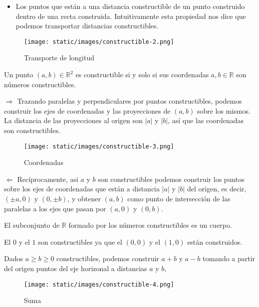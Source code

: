 \begin{itemize}
\tightlist
\item
  Los puntos que están a una distancia constructible de un punto
  construido dentro de una recta construida. Intuitivamente esta
  propiedad nos dice que podemos transportar distancias constructibles.
\end{itemize}

\begin{figure}
\centering
\texttt{[image: static/images/constructible-2.png]}
\caption{Transporte de longitud}
\end{figure}


Un punto \((a,b)\in\mathbb R^2\) es constructible si y solo si sus
coordenadas \(a,b\in\mathbb R\) son números constructibles.


\(\Rightarrow\) Trazando paralelas y perpendiculares por puntos
constructibles, podemos construir los ejes de coordenadas y las
proyecciones de \((a,b)\) sobre los mismos. La distancia de las
proyecciones al origen son \(|a|\) y \(|b|\), así que las coordenadas
son constructibles.

\begin{figure}
\centering
\texttt{[image: static/images/constructible-3.png]}
\caption{Coordenadas}
\end{figure}

\(\Leftarrow\) Recíprocamente, asi \(a\) y \(b\) son constructibles
podemos construir los puntos sobre los ejes de coordenadas que están a
distancia \(|a|\) y \(|b|\) del origen, es decir, \((\pm a,0)\) y
\((0,\pm b)\), y obtener \((a,b)\) como punto de intersección de las
paralelas a los ejes que pasan por \((a,0)\) y \((0,b)\). 


El subconjunto de \(\mathbb R\) formado por los números constructibles
es un cuerpo. 


El \(0\) y el \(1\) son constructibles ya que el \((0,0)\) y el
\((1,0)\) están construidos.

Dados \(a\geq b\geq 0\) constructibles, podemos construir \(a+b\) y
\(a-b\) tomando a partir del origen puntos del eje horizonal a
distancias \(a\) y \(b\),

\begin{figure}
\centering
\texttt{[image: static/images/constructible-4.png]}
\caption{Suma}
\end{figure}

